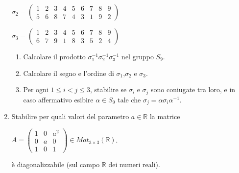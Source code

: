 \documentclass[fleqn]{article}
\begin{document}
\begin{enumerate}
\begin{center}
      $ \sigma_{2} = \begin{pmatrix}
         1 & 2 & 3 & 4 & 5 & 6 & 7 & 8 & 9 \\
         5 & 6 & 8 & 7 & 4 & 3 & 1 & 9 & 2
      \end{pmatrix} $

      $ \sigma_{3} = \begin{pmatrix}
         1 & 2 & 3 & 4 & 5 & 6 & 7 & 8 & 9 \\
         6 & 7 & 9 & 1 & 8 & 3 & 5 & 2 & 4
      \end{pmatrix} $
   \end{center}

   \begin{enumerate}
      \item Calcolare il prodotto $\sigma_{1}^{-1} \sigma_{2}^{-1} \sigma_{3}^{-1}$ nel gruppo $S_9$.
      \item Calcolare il segno e l'ordine di $\sigma_{1}$,$\sigma_{2}$ e $\sigma_{3}$.
      \item Per ogni $1 \leq i < j \leq 3$, stabilire se $\sigma_{i}$ e $\sigma_{j}$ sono coniugate tra loro, e in caso affermativo esibire $\alpha \in S_9$ tale che $\sigma_{j}= \alpha \sigma_{i} \alpha^{-1}$.
   \end{enumerate}

   \item Stabilire per quali valori del parametro $a \in \mathbb{R}$ la matrice 
   \begin{center}
   $A = \begin{pmatrix}
         1 & 0 & a^2 \\
         0 & a & 0 \\
         1 & 0 & 1 
      \end{pmatrix}
      \in Mat_{3 \times 3}(\mathbb{R})$.
   \end{center}
   è diagonalizzabile (sul campo $\mathbb{R}$ dei numeri reali).


\end{enumerate}
\end{document}
